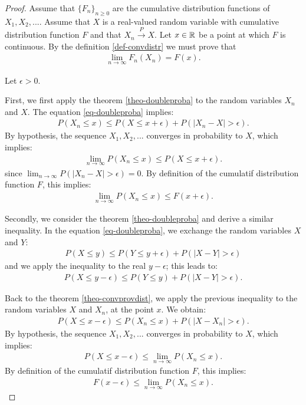 \documentclass{article}
\begin{document}
\begin{proof}
Assume that $\{F_n\}_{n\geq 0}$ are the cumulative distribution functions of $X_1,X_2,...$. 
Assume that $X$ is a real-valued random variable 
with cumulative distribution function $F$ and that 
$X_n \xrightarrow{P} X$. 
Let $x\in \mathbb{R}$ be a point at which $F$ is continuous.
By the definition \ref{def-convdistr} we must prove that 
\begin{align}
\label{eq-convprovdist1}
\lim_{n\rightarrow \infty} F_n(X_n)=F(x).
\end{align}

Let $\epsilon>0$. 

First, we first apply the theorem \ref{theo-doubleproba} to the random variables $X_n$ and $X$. 
The equation \ref{eq-doubleproba} implies:
\begin{align*}
P(X_n\leq x) \leq P(X\leq x+\epsilon) + P(|X_n-X|> \epsilon).
\end{align*}
By hypothesis, the sequence $X_1,X_2,...$ converges in probability to $X$, which 
implies:
\begin{align*}
\lim_{n\rightarrow \infty} P(X_n\leq x) \leq P(X\leq x+\epsilon).
\end{align*}
since 
$\lim_{n\rightarrow \infty} P(|X_n-X|> \epsilon) = 0$. 
By definition of the cumulatif distribution function $F$, this implies:
\begin{align}
\label{eq-convprovdist2}
\lim_{n\rightarrow \infty} P(X_n\leq x) \leq F(x+\epsilon).
\end{align}

Secondly, we consider the theorem \ref{theo-doubleproba} and derive a similar  
inequality. 
In the equation \ref{eq-doubleproba}, we exchange the random variables $X$ and $Y$:
\begin{align*}
P(X\leq y) \leq P(Y\leq y+\epsilon) + P(|X-Y|> \epsilon)
\end{align*}
and we apply the inequality to the real $y-\epsilon$; this leads to:
\begin{align*}
P(X\leq y-\epsilon) \leq P(Y\leq y) + P(|X-Y|> \epsilon).
\end{align*}

Back to the theorem \ref{theo-convprovdist}, we apply the previous inequality 
to the random variables $X$ and $X_n$, at the point $x$. 
We obtain:
\begin{align*}
P(X\leq x-\epsilon) \leq P(X_n\leq x) + P(|X-X_n|> \epsilon).
\end{align*}
By hypothesis, the sequence $X_1,X_2,...$ converges in probability to $X$, which 
implies:
\begin{align*}
P(X\leq x-\epsilon) \leq \lim_{n\rightarrow \infty} P(X_n\leq x) .
\end{align*}
By definition of the cumulatif distribution function $F$, this implies:
\begin{align}
\label{eq-convprovdist3}
F(x-\epsilon) \leq \lim_{n\rightarrow \infty} P(X_n\leq x) .
\end{align}


\end{proof}
\end{document}
